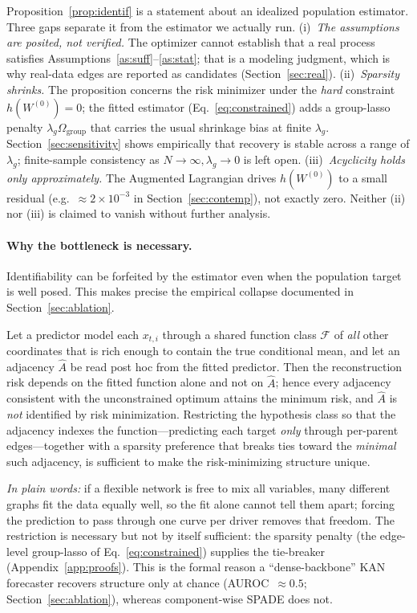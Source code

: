 \begin{remark}\label{rem:whatprop1claims}
Proposition~\ref{prop:identif} is a statement about an idealized population
estimator. Three gaps separate it from the estimator we actually run.
(i)~\emph{The assumptions are posited, not verified.} The optimizer cannot
establish that a real process satisfies Assumptions~\ref{as:suff}--\ref{as:stat};
that is a modeling judgment, which is why real-data edges are reported as
candidates (Section~\ref{sec:real}).
(ii)~\emph{Sparsity shrinks.} The proposition concerns the risk minimizer under
the \emph{hard} constraint $h(W^{(0)})=0$; the fitted estimator
(Eq.~\ref{eq:constrained}) adds a group-lasso penalty $\lambda_g\Omega_{\mathrm{group}}$
that carries the usual shrinkage bias at finite $\lambda_g$. Section~\ref{sec:sensitivity}
shows empirically that recovery is stable across a range of $\lambda_g$;
finite-sample consistency as $N\to\infty,\lambda_g\to 0$ is left open.
(iii)~\emph{Acyclicity holds only approximately.} The Augmented Lagrangian drives
$h(W^{(0)})$ to a small residual (e.g.\ $\approx 2\times10^{-3}$ in
Section~\ref{sec:contemp}), not exactly zero. Neither (ii) nor (iii) is claimed to
vanish without further analysis.
\end{remark}

\paragraph{Why the bottleneck is necessary.} Identifiability can be forfeited by
the estimator even when the population target is well posed. This makes precise
the empirical collapse documented in Section~\ref{sec:ablation}.
\begin{proposition}\label{prop:bottleneck}
Let a predictor model each $x_{t,i}$ through a shared function class
$\mathcal{F}$ of \emph{all} other coordinates that is rich enough to contain the
true conditional mean, and let an adjacency $\hat A$ be read post hoc from the
fitted predictor. Then the reconstruction risk depends on the fitted function
alone and not on $\hat A$; hence every adjacency consistent with the unconstrained
optimum attains the minimum risk, and $\hat A$ is \emph{not} identified by risk
minimization. Restricting the hypothesis class so that the adjacency indexes the
function---predicting each target \emph{only} through per-parent edges---together
with a sparsity preference that breaks ties toward the \emph{minimal} such
adjacency, is sufficient to make the risk-minimizing structure unique.
\end{proposition}
\emph{In plain words:} if a flexible network is free to mix all variables, many
different graphs fit the data equally well, so the fit alone cannot tell them
apart; forcing the prediction to pass through one curve per driver removes that
freedom. The restriction is necessary but not by itself sufficient: the sparsity
penalty (the edge-level group-lasso of Eq.~\eqref{eq:constrained}) supplies the
tie-breaker (Appendix~\ref{app:proofs}). This is the formal reason a
``dense-backbone'' KAN forecaster recovers structure only at chance
(AUROC~$\approx 0.5$; Section~\ref{sec:ablation}), whereas component-wise
SPADE does not.

